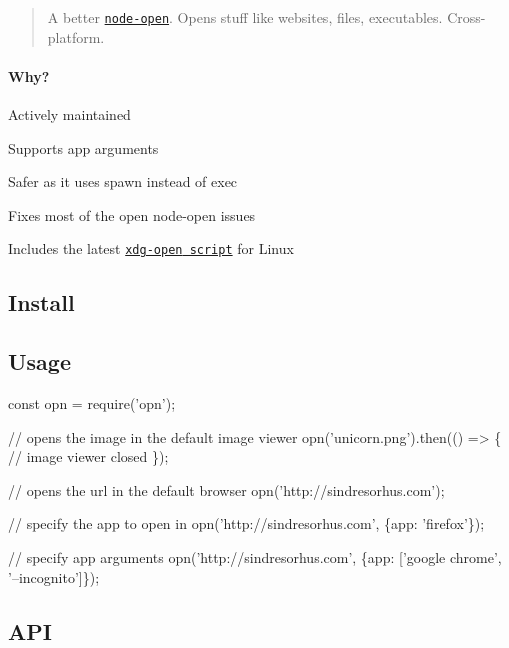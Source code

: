 \begin{quote}
A better \href{https://github.com/pwnall/node-open}{\tt node-\/open}. Opens stuff like websites, files, executables. Cross-\/platform. \end{quote}


\paragraph*{Why?}


\begin{DoxyItemize}
\item Actively maintained
\item Supports app arguments
\item Safer as it uses {\ttfamily spawn} instead of {\ttfamily exec}
\item Fixes most of the open {\ttfamily node-\/open} issues
\item Includes the latest \href{http://cgit.freedesktop.org/xdg/xdg-utils/commit/?id=c55122295c2a480fa721a9614f0e2d42b2949c18}{\tt {\ttfamily xdg-\/open} script} for Linux
\end{DoxyItemize}

\subsection*{Install}




\subsection*{Usage}


\begin{DoxyCode}
const opn = require('opn');

// opens the image in the default image viewer
opn('unicorn.png').then(() => \{
    // image viewer closed
\});

// opens the url in the default browser
opn('http://sindresorhus.com');

// specify the app to open in
opn('http://sindresorhus.com', \{app: 'firefox'\});

// specify app arguments
opn('http://sindresorhus.com', \{app: ['google chrome', '--incognito']\});
\end{DoxyCode}


\subsection*{A\+PI}

